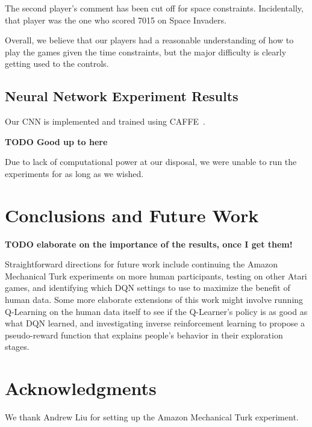 \documentclass[letterpaper, 10 pt, conference]{ieeeconf}  %
\begin{document}
The second player's comment has been cut off for space constraints. Incidentally, that player was
the one who scored 7015 on Space Invaders.

Overall, we believe that our players had a reasonable understanding of how to play the games given
the time constraints, but the major difficulty is clearly getting used to the controls.

\subsection{Neural Network Experiment Results}\label{ssec:nn_results}

Our CNN is implemented and trained using CAFFE~\cite{caffe}.

\textbf{TODO Good up to here}

Due to lack of computational power at our disposal, we were unable to run the experiments for as
long as we wished.


\section{Conclusions and Future Work}\label{sec:conclusions}

\textbf{TODO elaborate on the importance of the results, once I get them!} 

Straightforward directions for future work include continuing the Amazon Mechanical Turk experiments
on more human participants, testing on other Atari games, and identifying which DQN settings to use
to maximize the benefit of human data. Some more elaborate extensions of this work might involve
running Q-Learning on the human data itself to see if the Q-Learner's policy is as good as what DQN
learned, and investigating inverse reinforcement learning to propose a pseudo-reward function that
explains people's behavior in their exploration stages.

\section*{Acknowledgments}

We thank Andrew Liu for setting up the Amazon Mechanical Turk experiment.


\end{document}
